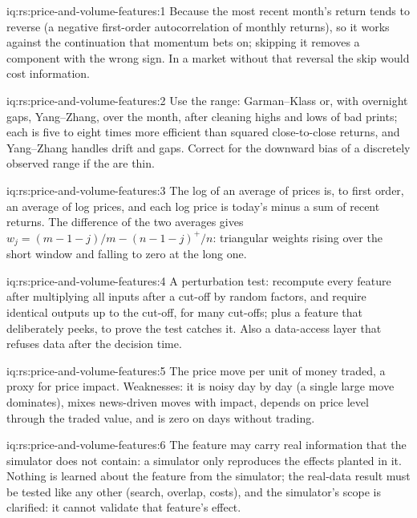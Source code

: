 \begin{solution}{iq:rs:price-and-volume-features:1}
Because the most recent month's return tends to reverse (a negative first-order autocorrelation of monthly returns), so it works against
the continuation that momentum bets on; skipping it removes a component with the wrong sign. In a market without that reversal the skip
would cost information.
\end{solution}

\begin{solution}{iq:rs:price-and-volume-features:2}
Use the range: Garman--Klass or, with overnight gaps, Yang--Zhang, over the month, after cleaning highs and lows of bad prints; each is five
to eight times more efficient than squared close-to-close returns, and Yang--Zhang handles drift and gaps. Correct for the downward bias
of a discretely observed range if the  are thin.
\end{solution}

\begin{solution}{iq:rs:price-and-volume-features:3}
The log of an average of prices is, to first order, an average of log prices, and each log price is today's minus a sum of recent returns.
The difference of the two averages gives $w_j = (m - 1 - j)/m - (n - 1 - j)^+/n$: triangular weights rising over the short window and
falling to zero at the long one.
\end{solution}

\begin{solution}{iq:rs:price-and-volume-features:4}
A perturbation test: recompute every feature after multiplying all inputs after a cut-off by random factors, and require identical outputs
up to the cut-off, for many cut-offs; plus a feature that deliberately peeks, to prove the test catches it. Also a data-access layer that
refuses data after the decision time.
\end{solution}

\begin{solution}{iq:rs:price-and-volume-features:5}
The price move per unit of money traded, a proxy for price impact. Weaknesses: it is noisy day by day (a single large move dominates), mixes
news-driven moves with impact, depends on price level through the traded value, and is zero on days without trading.
\end{solution}

\begin{solution}{iq:rs:price-and-volume-features:6}
The feature may carry real information that the simulator does not contain: a simulator only reproduces the effects planted in it. Nothing
is learned about the feature from the simulator; the real-data result must be tested like any other (search, overlap, costs), and the
simulator's scope is clarified: it cannot validate that feature's effect.
\end{solution}
